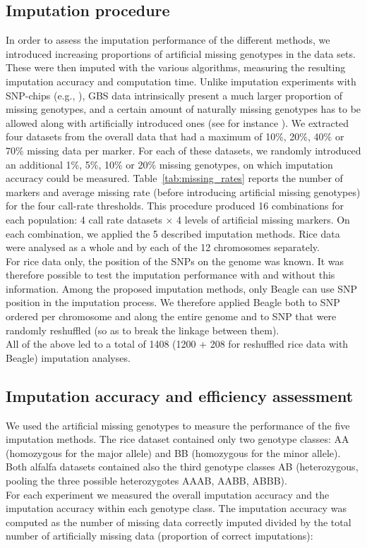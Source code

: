 \subsection{Imputation procedure}
\label{sec:imputation_procedure}
In order to assess the imputation performance of the different methods, we introduced increasing proportions of artificial missing genotypes in the data sets. These were then imputed with the various algorithms, measuring the resulting imputation accuracy and computation time. Unlike imputation experiments with SNP-chips (e.g., \cite{hickey_factors_2012}), GBS data intrinsically present a much larger proportion of missing genotypes, and a certain amount of naturally missing genotypes has to be allowed along with artificially introduced ones (see for instance \cite{rutkoski_imputation_2013}). We extracted four datasets from the overall data that had a maximum of 10\%, 20\%, 40\% or 70\% missing data per marker. For each of these datasets, we randomly introduced an additional 1\%, 5\%, 10\% or 20\% missing genotypes, on which imputation accuracy could be measured. Table~\ref{tab:missing_rates} reports the number of markers and average missing rate (before introducing artificial missing genotypes) for the four call-rate thresholds. This procedure produced 16 combinations for each population: 4 call rate datasets $\times$ 4 levels of artificial missing markers. On each combination, we applied the 5 described imputation methods. Rice data were analysed as a whole and by each of the 12 chromosomes separately. \\
For rice data only, the position of the SNPs on the genome was known. It was therefore possible to test the imputation performance with and without this information. Among the proposed imputation methods, only Beagle can use SNP position in the imputation process. We therefore applied Beagle both to SNP ordered per chromosome and along the entire genome and to SNP that were randomly reshuffled (so as to break the linkage between them). \\
All of the above led to a total of 1408 (1200 + 208 for reshuffled rice data with Beagle) imputation analyses.



\subsection{Imputation accuracy and efficiency assessment}
\label{sec:imputation_accuracy_and_efficiency_assessment}
We used the artificial missing genotypes to measure the performance of the five imputation methods. The rice dataset contained only two genotype classes: AA (homozygous for the major allele) and BB (homozygous for the minor allele). Both alfalfa datasets contained also the third genotype classes AB (heterozygous, pooling the three possible heterozygotes AAAB, AABB, ABBB).\\
For each experiment we measured the overall imputation accuracy and the imputation accuracy within each genotype class. The imputation accuracy was computed as the number of missing data correctly imputed divided by the total number of artificially missing data (proportion of correct imputations):

